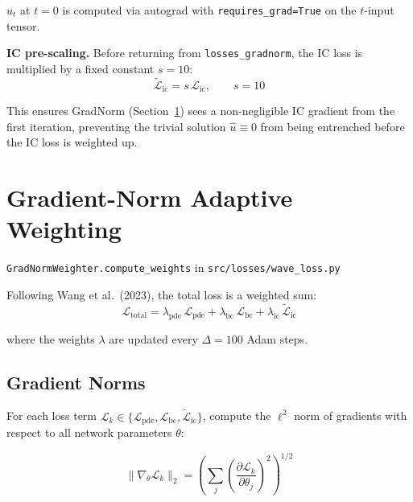 \documentclass[11pt, a4paper]{article}
\newcommand{\fn}[1]{\texttt{\color{codeblue}#1}}
\newcommand{\file}[1]{\texttt{#1}}
\begin{document}
$\hat{u}_t$ at $t=0$ is computed via autograd with \texttt{requires\_grad=True}
on the $t$-input tensor.

\textbf{IC pre-scaling.} Before returning from \fn{losses\_gradnorm}, the IC
loss is multiplied by a fixed constant $s = 10$:
\begin{equation}
  \tilde{\mathcal{L}}_{\mathrm{ic}} = s\,\mathcal{L}_{\mathrm{ic}},
  \qquad s = 10
  \label{eq:ic_scale}
\end{equation}

This ensures GradNorm (Section~\ref{sec:gradnorm}) sees a non-negligible
IC gradient from the first iteration, preventing the trivial solution
$\hat{u} \equiv 0$ from being entrenched before the IC loss is weighted up.


\section{Gradient-Norm Adaptive Weighting}
\label{sec:gradnorm}
\fn{GradNormWeighter.compute\_weights} in \file{src/losses/wave\_loss.py}

Following Wang et al.\ (2023), the total loss is a weighted sum:
\begin{equation}
  \mathcal{L}_{\mathrm{total}}
  = \lambda_{\mathrm{pde}}\,\mathcal{L}_{\mathrm{pde}}
  + \lambda_{\mathrm{bc}}\,\mathcal{L}_{\mathrm{bc}}
  + \lambda_{\mathrm{ic}}\,\tilde{\mathcal{L}}_{\mathrm{ic}}
  \label{eq:total_loss}
\end{equation}

where the weights $\lambda$ are updated every $\Delta = 100$ Adam steps.

\subsection{Gradient Norms}

For each loss term $\mathcal{L}_k \in \{\mathcal{L}_{\mathrm{pde}},
\mathcal{L}_{\mathrm{bc}}, \tilde{\mathcal{L}}_{\mathrm{ic}}\}$, compute
the $\ell^2$ norm of gradients with respect to all network parameters $\theta$:

\begin{equation}
  \|\nabla_\theta \mathcal{L}_k\|_2
  = \left(\sum_{j} \left(\frac{\partial \mathcal{L}_k}{\partial \theta_j}\right)^2
    \right)^{1/2}
  \label{eq:grad_norm}
\end{equation}
\end{document}
